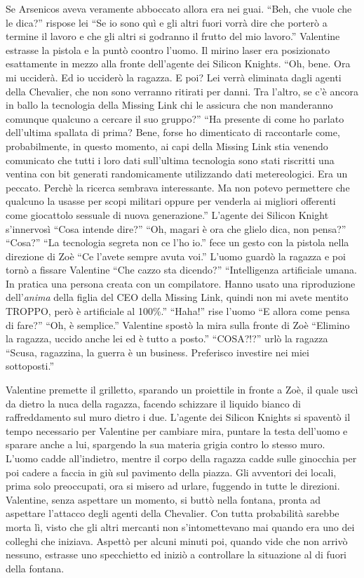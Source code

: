     Se Arsenicos aveva veramente abboccato allora era nei guai. ``Beh, che vuole che le dica?'' rispose lei ``Se io sono
    quì e gli altri fuori vorrà dire che porterò a termine il lavoro e che gli altri si godranno il frutto del mio
    lavoro.'' Valentine estrasse la pistola e la puntò coontro l'uomo. Il mirino laser era posizionato esattamente in
    mezzo alla fronte dell'agente dei Silicon Knights. ``Oh, bene. Ora mi ucciderà. Ed io ucciderò la ragazza. E poi?
    Lei verrà eliminata dagli agenti della Chevalier, che non sono verranno ritirati per danni. Tra l'altro, se c'è
    ancora in ballo la tecnologia della Missing Link chi le assicura che non manderanno comunque qualcuno a cercare il
    suo gruppo?'' ``Ha presente di come ho parlato dell'ultima spallata di prima? Bene, forse ho dimenticato di
    raccontarle come, probabilmente, in questo momento, ai capi della Missing Link stia venendo comunicato che tutti i
    loro dati sull'ultima tecnologia sono stati riscritti una ventina con bit generati randomicamente utilizzando dati
    metereologici. Era un peccato. Perchè  la ricerca sembrava interessante. Ma non potevo permettere che qualcuno la
    usasse per scopi militari oppure per venderla ai migliori offerenti come giocattolo sessuale di nuova generazione.''
    L'agente dei Silicon Knight s'innervosì ``Cosa intende dire?'' ``Oh, magari è ora che glielo dica, non pensa?''
    ``Cosa?'' ``La tecnologia segreta non ce l'ho io.'' fece un gesto con la pistola nella direzione di Zoè ``Ce l'avete
    sempre avuta voi.'' L'uomo guardò la ragazza e poi tornò a fissare Valentine ``Che cazzo sta dicendo?''
    ``Intelligenza artificiale umana. In pratica una persona creata con un compilatore. Hanno usato una riproduzione
    dell'\emph{anima} della figlia del CEO della Missing Link, quindi non mi avete mentito TROPPO, però è artificiale al
    100\%.'' ``Haha!'' rise l'uomo  ``E allora come pensa di fare?'' ``Oh, è semplice.'' Valentine spostò la mira sulla
    fronte di Zoè ``Elimino la ragazza, uccido anche lei ed è tutto a posto.'' ``COSA?!?'' urlò la ragazza ``Scusa,
    ragazzina, la guerra è un business. Preferisco investire nei miei sottoposti.''

    Valentine premette il grilletto, sparando un proiettile in fronte a Zoè, il quale uscì da dietro la nuca della
    ragazza, facendo schizzare il liquido bianco di raffreddamento sul muro dietro i due. L'agente dei Silicon Knights
    si spaventò il tempo necessario per Valentine per cambiare mira, puntare la testa dell'uomo e sparare anche a lui,
    spargendo la sua materia grigia contro lo stesso muro. L'uomo cadde all'indietro, mentre il corpo della ragazza
    cadde sulle ginocchia per poi cadere a faccia in giù sul pavimento della piazza. Gli avventori dei locali, prima
    solo preoccupati, ora si misero ad urlare, fuggendo in tutte le direzioni. Valentine, senza aspettare un momento, si
    buttò nella fontana, pronta ad aspettare l'attacco degli agenti della Chevalier. Con tutta probabilità sarebbe morta
    lì, visto che gli altri mercanti non s'intomettevano mai quando era uno dei colleghi che iniziava. Aspettò per
    alcuni minuti poi, quando vide che non arrivò nessuno, estrasse uno specchietto ed iniziò a controllare la
    situazione al di fuori della fontana.

